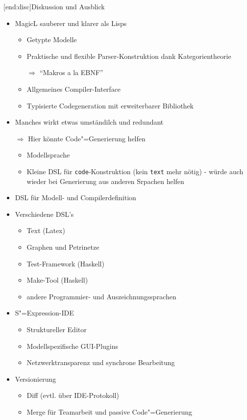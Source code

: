\documentclass[11pt, a4paper, bibgerm]{book}
\newcommand\icode[1]{\lstinline?#1?}
\newcommand\lsection{}
\newcommand{\sexp}{S"=Expression}
\newcommand{\cgen}{Code"=Generierung}
\begin{document}
\lsection[end:disc]{Diskussion und Ausblick}

  \begin{itemize}
  \item MagicL sauberer und klarer als Lisps
    \begin{itemize}
    \item Getypte Modelle
    \item Praktische und flexible Parser-Konstruktion dank Kategorientheorie
    \item[$\Rightarrow$] "`Makros a la EBNF"'
    \item Allgemeines Compiler-Interface
    \item Typisierte Codegeneration mit erweiterbarer Bibliothek
    \end{itemize}
  \item Manches wirkt etwas umständilch und redundant
  \item[$\Rightarrow$] Hier könnte \cgen{} helfen
    \begin{itemize}
    \item Modellsprache
    \item Kleine DSL für \icode{code}-Konstruktion (kein \icode{text}
      mehr nötig) - würde auch wieder bei Generierung aus anderen
      Srpachen helfen
    \end{itemize}
\item DSL für Modell- und Compilerdefinition
\item Verschiedene DSL's
  \begin{itemize}
  \item Text (Latex)
  \item Graphen und Petrinetze
  \item Test-Framework (Haskell)
  \item Make-Tool (Haskell)
  \item andere Programmier- und Auszeichnungssprachen
  \end{itemize}
\item \sexp{}-IDE
  \begin{itemize}
  \item Struktureller Editor
  \item Modellspezifische GUI-Plugins
  \item Netzwerktransparenz und synchrone Bearbeitung
  \end{itemize}
\item Versionierung
  \begin{itemize}
  \item Diff (evtl. über IDE-Protokoll)
  \item Merge für Teamarbeit und passive \cgen{}
  \end{itemize}
\end{itemize}
\end{document}
